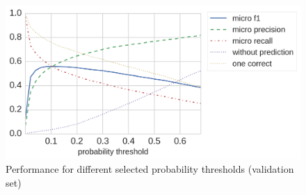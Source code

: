 \begin{figure}[t]
\centering
\includegraphics[width=.7\textwidth]{figures/fields-precision-recall.png}
    \caption{Performance for different selected probability thresholds (validation set)}
\label{fig:fields_precision_recall}
\end{figure}



